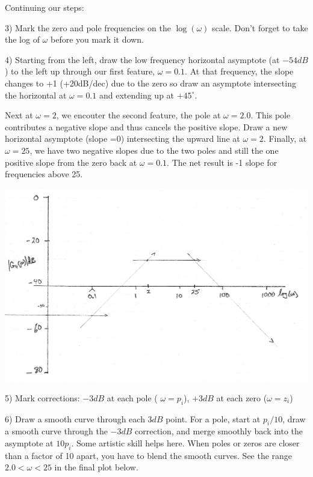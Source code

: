 \begin{ExampleCont}
\noindent
Continuing our steps: 

3) Mark the zero and pole frequencies on the $\log(\omega)$ scale.   Don't forget to take the log of $\omega$ before you mark it down.

4) Starting from the left, draw the low frequency horizontal asymptote (at $-54dB$) to the left up through our first feature, $\omega = 0.1$.  At that frequency, the slope changes to +1 (+20dB/dec) due to the zero so draw an asymptote intersecting the horizontal at $\omega=0.1$ and extending up at $+45^\circ$.

Next at $\omega=2$, we encouter the second feature, the pole at $\omega=2.0$. This pole contributes a negative slope and thus cancels the positive slope.  Draw a new horizontal asymptote (slope =0) intersecting the upward line at $\omega=2$.   Finally, at $\omega = 25$, we have two negative slopes due to the two poles and still the one positive slope from the zero back at $\omega = 0.1$.  The net result is -1 slope for frequencies above 25.

\includegraphics[width=6.5in]{figs05/00738a.png}

5) Mark corrections:   $-3dB$ at each pole ( $\omega = p_i$),   $+3dB$ at  each zero ($\omega=z_i$)

6) Draw a smooth curve through each $3dB$ point.  For a pole, start at $p_i/10$, draw a smooth curve through the $-3dB$ correction, and merge smoothly back into the asymptote at $10p_i$.   Some artistic skill helps here.  When poles or zeros are closer than a factor of 10 apart, you have to blend the smooth curves.  See the range $2.0 < \omega < 25$ in the final plot below.
\end{ExampleCont}


